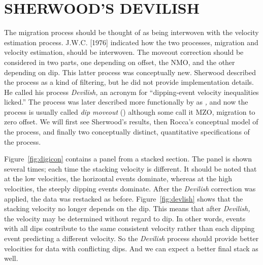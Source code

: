 \section{SHERWOOD'S DEVILISH}
The migration process should be thought of as being interwoven with the
velocity estimation process.
J.W.C.  [1976] indicated how the two processes,
migration and velocity estimation, should be interwoven.
The moveout correction should be considered in two parts,
one depending on offset, the NMO, and the other depending on dip.
This latter process was conceptually new.
Sherwood described the process as a kind of filtering,
but he did not provide implementation details.
He called his process
{\em  Devilish,}
an acronym for ``dipping-event velocity inequalities licked.''
The process was later described more functionally by  as
{\em 
{},
}
and now
the process is usually called
{\em 
dip moveout
}
()
although some call it MZO, migration to zero offset.
We will first see Sherwood's results,
then Rocca's conceptual model of the  process,
and finally two conceptually distinct, quantitative specifications
of the process.
\par
Figure~\ref{fig:digicon} contains a panel from a stacked section.
The panel is shown several times;
each time the stacking velocity is different.  
It should be noted that at the low velocities,
the horizontal events dominate,
whereas at the high velocities,
the steeply dipping events dominate.
After the
{\em  Devilish}
correction was applied, the data was restacked as before.
Figure~\ref{fig:devlish} shows that the stacking velocity
no longer depends on the dip.
This means that after 
{\em  Devilish,}
the velocity may be determined without regard to dip.
In other words,
events with all dips contribute to the same consistent velocity
rather than each dipping event predicting a different velocity.
So the 
{\em  Devilish} 
process should provide better velocities for data with conflicting dips.
And we can expect a better final stack as well.

